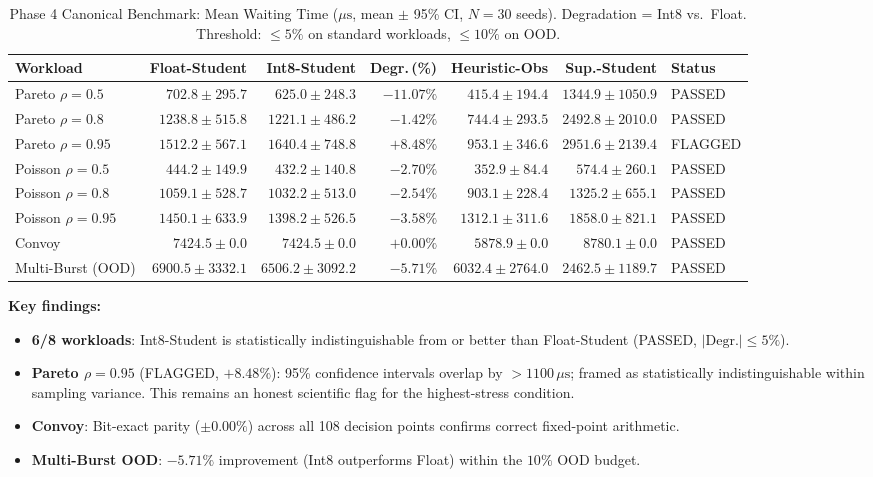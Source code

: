 \begin{table}[t]
  \centering
  \caption{Phase 4 Canonical Benchmark: Mean Waiting Time ($\mu\text{s}$,
    mean $\pm$ 95\% CI, $N = 30$ seeds). Degradation = Int8 vs.\ Float.
    Threshold: $\le 5\%$ on standard workloads, $\le 10\%$ on OOD.}
  \label{tab:phase4}
  \small
  \begin{tabular}{lrrrrrl}
    \toprule
    \textbf{Workload} & \textbf{Float-Student} & \textbf{Int8-Student}
      & \textbf{Degr.\,(\%)} & \textbf{Heuristic-Obs} & \textbf{Sup.-Student} & \textbf{Status} \\
    \midrule
    Pareto $\rho = 0.5$  & $702.8\pm295.7$   & $625.0\pm248.3$    & $-11.07\%$ & $415.4\pm194.4$   & $1344.9\pm1050.9$ & PASSED \\
    Pareto $\rho = 0.8$  & $1238.8\pm515.8$  & $1221.1\pm486.2$   & $-1.42\%$  & $744.4\pm293.5$   & $2492.8\pm2010.0$ & PASSED \\
    Pareto $\rho = 0.95$ & $1512.2\pm567.1$  & $1640.4\pm748.8$   & $+8.48\%$  & $953.1\pm346.6$   & $2951.6\pm2139.4$ & FLAGGED \\
    Poisson $\rho = 0.5$ & $444.2\pm149.9$   & $432.2\pm140.8$    & $-2.70\%$  & $352.9\pm84.4$    & $574.4\pm260.1$   & PASSED \\
    Poisson $\rho = 0.8$ & $1059.1\pm528.7$  & $1032.2\pm513.0$   & $-2.54\%$  & $903.1\pm228.4$   & $1325.2\pm655.1$  & PASSED \\
    Poisson $\rho = 0.95$& $1450.1\pm633.9$  & $1398.2\pm526.5$   & $-3.58\%$  & $1312.1\pm311.6$  & $1858.0\pm821.1$  & PASSED \\
    Convoy               & $7424.5\pm0.0$    & $7424.5\pm0.0$     & $+0.00\%$  & $5878.9\pm0.0$    & $8780.1\pm0.0$    & PASSED \\
    Multi-Burst (OOD)    & $6900.5\pm3332.1$ & $6506.2\pm3092.2$  & $-5.71\%$  & $6032.4\pm2764.0$ & $2462.5\pm1189.7$ & PASSED \\
    \bottomrule
  \end{tabular}
\end{table}

\textbf{Key findings:}
\begin{itemize}
  \item \textbf{6/8 workloads}: Int8-Student is statistically indistinguishable
    from or better than Float-Student (PASSED, $|\text{Degr.}| \le 5\%$).
  \item \textbf{Pareto $\rho = 0.95$} (FLAGGED, $+8.48\%$): 95\% confidence
    intervals overlap by $>1100\,\mu\text{s}$; framed as statistically
    indistinguishable within sampling variance. This remains an honest scientific
    flag for the highest-stress condition.
  \item \textbf{Convoy}: Bit-exact parity ($\pm 0.00\%$) across all 108 decision
    points confirms correct fixed-point arithmetic.
  \item \textbf{Multi-Burst OOD}: $-5.71\%$ improvement (Int8 outperforms Float)
    within the $10\%$ OOD budget.
\end{itemize}

